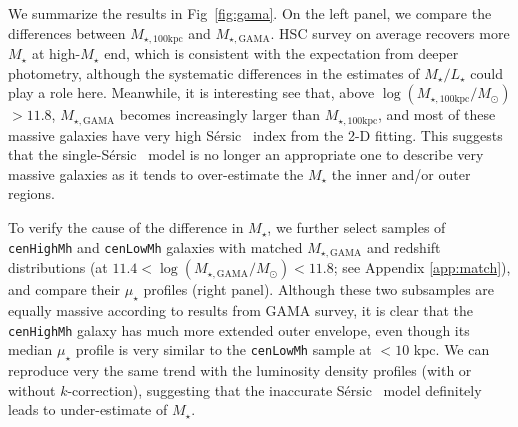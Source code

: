 \documentclass[a4paper,fleqn,usenatbib]{mnras}
\def\ser{{S\'{e}rsic\ }}
\def\rbcg{\texttt{cenHighMh}}
\def\nbcg{\texttt{cenLowMh}}
\def\mstar{{$M_{\star}$}}
\def\mtot{{$M_{\star,100\mathrm{kpc}}$}}
\def\mgama{{$M_{\star,\mathrm{GAMA}}$}}
\def\logmtot{{$\log (M_{\star,100\mathrm{kpc}}/M_{\odot})$}}
\def\logmgama{{$\log (M_{\star,\mathrm{GAMA}}/M_{\odot})$}}
\def\m2l{{$M_{\star}/L_{\star}$}}
\def\mden{{$\mu_{\star}$}}
\begin{document}
    We summarize the results in Fig~\ref{fig:gama}.  
    On the left panel, we compare the differences between \mtot{} and \mgama{}. 
    HSC survey on average recovers more \mstar{} at high-\mstar{} end, which is 
    consistent with the expectation from deeper photometry, although the 
    systematic differences in the estimates of \m2l{} could play a role here. 
    Meanwhile, it is interesting see that, above \logmtot{}$> 11.8$, \mgama{} 
    becomes increasingly larger than \mtot{}, and most of these massive 
    galaxies have very high \ser{} index from the 2-D fitting. 
    This suggests that the single-\ser{} model is no longer an appropriate one to 
    describe very massive galaxies as it tends to over-estimate the \mstar{} the 
    inner and/or outer regions. 
    
    To verify the cause of the difference in \mstar{}, we further select samples 
    of \rbcg{} and \nbcg{} galaxies with matched \mgama{} and redshift 
    distributions (at $11.4 <$\logmgama{}$<11.8$; see Appendix \ref{app:match}), 
    and compare their \mden{} profiles (right panel). 
    Although these two subsamples are equally massive according to results from 
    GAMA survey, it is clear that the \rbcg{} galaxy has much more extended 
    outer envelope, even though its median \mden{} profile is very similar 
    to the \nbcg{} sample at $< 10$ kpc. 
    We can reproduce very the same trend with the luminosity density profiles 
    (with or without $k$-correction), suggesting that the inaccurate \ser{} 
    model definitely leads to under-estimate of \mstar{}.  
 


\bsp
\label{lastpage}
\end{document}
